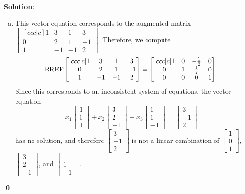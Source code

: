 \documentclass{article}
\newenvironment{solution}
{
  \ignorespaces
  \textbf{Solution:}
}
{
  \ignorespacesafterend
  \begin{flushright}
  {\bfseries \qed}
  \end{flushright}
}
\begin{document}
\begin{solution}
\begin{enumerate}[(a)]
\item This vector equation corresponds to the augmented matrix 
  \(\begin{bmatrix}[ccc|c]
  1 & 3 & 1 & 3 \\
  0 & 2 & 1 & -1 \\
  1 & -1 & -1 & 2
  \end{bmatrix}\).  Therefore, we compute
\[ \operatorname{RREF}
  \begin{bmatrix}[ccc|c]
  1 & 3 & 1 & 3 \\
  0 & 2 & 1 & -1 \\
  1 & -1 & -1 & 2
  \end{bmatrix}
  =
  \begin{bmatrix}[ccc|c]
  1 & 0 & -\frac{1}{2} & 0 \\
  0 & 1 & \frac{1}{2} & 0 \\
  0 & 0 & 0 & 1
  \end{bmatrix}.
\]
Since this corresponds to an inconsistent system of equations, the vector equation
\[
x_1\begin{bmatrix} 1 \\ 0 \\ 1 \end{bmatrix} +
x_2\begin{bmatrix} 3 \\ 2 \\ -1 \end{bmatrix} +
x_3\begin{bmatrix} 1 \\ 1 \\ -1 \end{bmatrix} =
\begin{bmatrix} 3 \\ -1 \\ 2 \end{bmatrix} \]
has no solution, and therefore 
\(\begin{bmatrix} 3 \\ -1 \\ 2 \end{bmatrix} \) is 
not a linear combination of \(\begin{bmatrix} 1 \\ 0 \\ 1 \end{bmatrix} \),
\(\begin{bmatrix} 3 \\ 2 \\ -1 \end{bmatrix} \), and
\(\begin{bmatrix} 1 \\ 1 \\ -1 \end{bmatrix} \).
\end{enumerate}
\end{solution}
\end{document}
